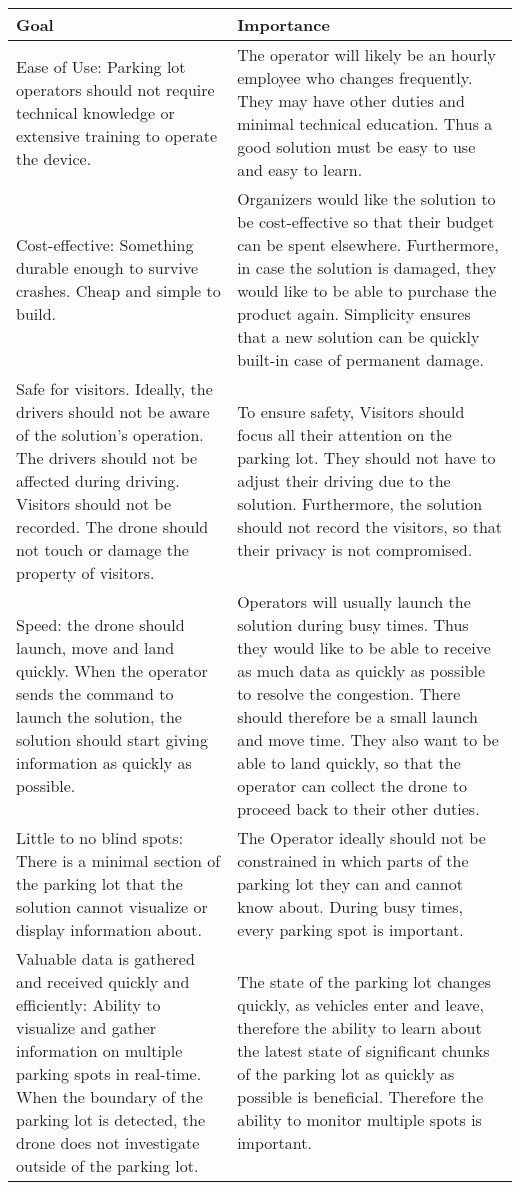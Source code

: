 \documentclass{article}
\begin{document}
\begin{table}
\begin{tabular}{ | m{5cm} | m{7cm} | }
  \hline
  Goal & Importance \\ 
  \hline
  Ease of Use: Parking lot operators should not require technical knowledge or extensive training to operate the device.
& The operator will likely be an hourly employee who changes frequently. They may have other duties and minimal technical education. Thus a good solution must be easy to use and easy to learn. 
  \\ 
  \hline
  Cost-effective: Something durable enough to survive crashes. Cheap and simple to build.
 & Organizers would like the solution to be cost-effective so that their budget can be spent elsewhere. Furthermore, in case the solution is damaged, they would like to be able to purchase the product again. Simplicity ensures that a new solution can be quickly built-in case of permanent damage. 
 \\ 
  \hline
  Safe for visitors. Ideally, the drivers should not be aware of the solution's operation. The drivers should not be affected during driving. Visitors should not be recorded. The drone should not touch or damage the property of visitors. 
 & To ensure safety, Visitors should focus all their attention on the parking lot. They should not have to adjust their driving due to the solution. Furthermore, the solution should not record the visitors, so that their privacy is not compromised.
 \\ 
  \hline
  Speed: the drone should launch, move and land quickly. When the operator sends the command to launch the solution, the solution should start giving information as quickly as possible. 
 & Operators will usually launch the solution during busy times. Thus they would like to be able to receive as much data as quickly as possible to resolve the congestion. There should therefore be a small launch and move time. They also want to be able to land quickly, so that the operator can collect the drone to proceed back to their other duties. 
 \\ 
  \hline
  Little to no blind spots: There is a minimal section of the parking lot that the solution cannot visualize or display information about.
 & The Operator ideally should not be constrained in which parts of the parking lot they can and cannot know about. During busy times, every parking spot is important.
 \\ 
  \hline
    Valuable data is gathered and received quickly and efficiently: Ability to visualize and gather information on multiple parking spots in real-time. When the boundary of the parking lot is detected, the drone does not investigate outside of the parking lot. 
 & The state of the parking lot changes quickly, as vehicles enter and leave, therefore the ability to learn about the latest state of significant chunks of the parking lot as quickly as possible is beneficial. Therefore the ability to monitor multiple spots is important.


\end{tabular}
\end{table}
\end{document}
